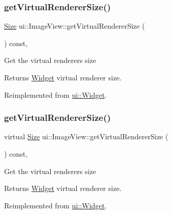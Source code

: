 \subsubsection{\texorpdfstring{get\+Virtual\+Renderer\+Size()}{getVirtualRendererSize()}\hspace{0.1cm}{\footnotesize\ttfamily [1/2]}}
{\footnotesize\ttfamily \hyperlink{classSize}{Size} ui\+::\+Image\+View\+::get\+Virtual\+Renderer\+Size (\begin{DoxyParamCaption}{ }\end{DoxyParamCaption}) const\hspace{0.3cm}{\ttfamily [override]}, {\ttfamily [virtual]}}

Get the virtual renderer\textquotesingle{}s size \begin{DoxyReturn}{Returns}
\hyperlink{classui_1_1Widget}{Widget} virtual renderer size. 
\end{DoxyReturn}


Reimplemented from \hyperlink{classui_1_1Widget_a2ed0d41565593f78dc59c975d58a869e}{ui\+::\+Widget}.

\mbox{\label{classui_1_1ImageView_ace03b24b332e54c73f4d36c83afddd3c}} 
\subsubsection{\texorpdfstring{get\+Virtual\+Renderer\+Size()}{getVirtualRendererSize()}\hspace{0.1cm}{\footnotesize\ttfamily [2/2]}}
{\footnotesize\ttfamily virtual \hyperlink{classSize}{Size} ui\+::\+Image\+View\+::get\+Virtual\+Renderer\+Size (\begin{DoxyParamCaption}{ }\end{DoxyParamCaption}) const\hspace{0.3cm}{\ttfamily [override]}, {\ttfamily [virtual]}}

Get the virtual renderer\textquotesingle{}s size \begin{DoxyReturn}{Returns}
\hyperlink{classui_1_1Widget}{Widget} virtual renderer size. 
\end{DoxyReturn}


Reimplemented from \hyperlink{classui_1_1Widget_a2ed0d41565593f78dc59c975d58a869e}{ui\+::\+Widget}.

